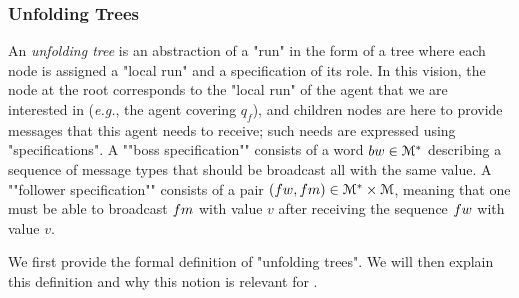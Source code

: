 \subsubsection{Unfolding Trees}
\label{sec:decidability-tree-unfoldings}

An \emph{unfolding tree} is an abstraction of a "run" in the form of a tree where each node is assigned a "local run" and a specification of its role. In this vision, the node at the root corresponds to the "local run" of the agent that we are interested in (\emph{e.g.}, the agent covering $q_f$), and children nodes are here to provide messages that this agent needs to receive; such needs are expressed using "specifications". 
A ""boss specification"" consists of a word $\bossspec \in \messages^*$ describing a sequence of message types that should be broadcast all with the same value. A ""follower specification"" consists of a pair $(\followwordspec, \followmessagespec) \in \messages^*\times \messages$, meaning that one must be able to broadcast $\followmessagespec$ with value $v$ after receiving the sequence $\followwordspec$ with value $v$. 

We first provide the formal definition of "unfolding trees". We will then explain this definition and why this notion is relevant for \COVER. 

